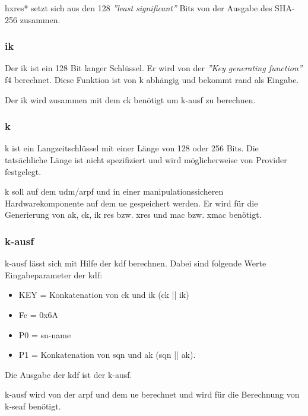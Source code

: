 \gls{hxres*} setzt sich aus den 128 \textit{''least significant''} Bits von der Ausgabe des SHA-256 zusammen.

\subsubsection{\gls{ik}}
Der \gls{ik} ist ein 128 Bit langer Schl\"ussel. %
Er wird von der \textit{''Key generating function''} f4 berechnet.
Diese Funktion ist von \gls{k} abh\"angig und bekommt \gls{rand} als Eingabe. %

Der \gls{ik} wird zusammen mit dem \gls{ck} ben\"otigt um \gls{k-ausf} zu berechnen.

\subsubsection{\gls{k}}
\gls{k} ist ein Langzeitschl\"ussel mit einer L\"ange von 128 oder 256 Bits. %
Die tats\"achliche L\"ange ist nicht spezifiziert und wird m\"oglicherweise von Provider festgelegt. %

\gls{k} soll auf dem \gls{udm}/\gls{arpf} und in einer manipulationssicheren Hardwarekomponente auf dem \gls{ue} gespeichert werden.  %
Er wird f\"ur die Generierung von \gls{ak}, \gls{ck}, \gls{ik} \gls{res} bzw. \gls{xres} und \gls{mac} bzw. \gls{xmac} ben\"otigt. 

\subsubsection{\gls{k-ausf}}
\gls{k-ausf} l\"asst sich mit Hilfe der \gls{kdf} berechnen.
Dabei sind folgende Werte Eingabeparameter der \gls{kdf}: %
\begin{itemize}
\item KEY = Konkatenation von \gls{ck} und \gls{ik} (\gls{ck} || \gls{ik})
\item Fc = 0x6A
\item P0 = \gls{sn-name}
\item P1 = Konkatenation von \gls{sqn} und \gls{ak} (\gls{sqn} || \gls{ak}).
\end{itemize}
Die Ausgabe der \gls{kdf} ist der \gls{k-ausf}.

\gls{k-ausf} wird von der \gls{arpf} und dem \gls{ue} berechnet und wird f\"ur die Berechnung von \gls{k-seaf} ben\"otigt.

